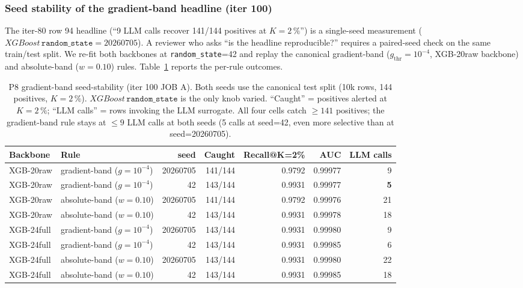 \documentclass{article}
\begin{document}
\subsubsection{Seed stability of the gradient-band headline (iter 100)}
\label{sec:p8-gradient-seed-stability}
The iter-80 row 94 headline (``9 LLM calls recover 141/144 positives at
$K{=}2\,\%$'') is a single-seed measurement ($XGBoost\,\texttt{random\_state}=20260705$).
A reviewer who asks ``is the headline reproducible?'' requires a paired-seed
check on the same train/test split. We re-fit both backbones at
\texttt{random\_state}=42 and replay the canonical gradient-band
($g_{\mathrm{thr}}{=}10^{-4}$, XGB-20raw backbone) and absolute-band
($w{=}0.10$) rules. Table~\ref{tab:p8-gradient-seed} reports the per-rule
outcomes.

\begin{table}[ht]
\centering
\small
\caption{P8 gradient-band seed-stability (iter 100 JOB A).
Both seeds use the canonical test split (10k rows, 144 positives, $K{=}2\,\%$).
$XGBoost\,\texttt{random\_state}$ is the only knob varied.
``Caught'' = positives alerted at $K{=}2\,\%$; ``LLM calls'' = rows invoking
the LLM surrogate. All four cells catch $\geq 141$ positives; the
gradient-band rule stays at $\leq 9$ LLM calls at both seeds (5 calls at
seed=42, even more selective than at seed=20260705).}
\label{tab:p8-gradient-seed}
\begin{tabular}{l l r r r r r}
\toprule
Backbone & Rule & seed & Caught & Recall@K=2\% & AUC & LLM calls \\
\midrule
XGB-20raw & gradient-band ($g{=}10^{-4}$) & 20260705 & 141/144 & 0.9792 & 0.99977 & 9 \\
XGB-20raw & gradient-band ($g{=}10^{-4}$) & 42        & 143/144 & 0.9931 & 0.99977 & \textbf{5} \\
XGB-20raw & absolute-band ($w{=}0.10$)    & 20260705 & 141/144 & 0.9792 & 0.99976 & 21 \\
XGB-20raw & absolute-band ($w{=}0.10$)    & 42        & 143/144 & 0.9931 & 0.99978 & 18 \\
XGB-24full & gradient-band ($g{=}10^{-4}$) & 20260705 & 143/144 & 0.9931 & 0.99980 & 9 \\
XGB-24full & gradient-band ($g{=}10^{-4}$) & 42        & 143/144 & 0.9931 & 0.99985 & 6 \\
XGB-24full & absolute-band ($w{=}0.10$)    & 20260705 & 143/144 & 0.9931 & 0.99980 & 22 \\
XGB-24full & absolute-band ($w{=}0.10$)    & 42        & 143/144 & 0.9931 & 0.99985 & 18 \\
\bottomrule
\end{tabular}
\end{table}
\end{document}
